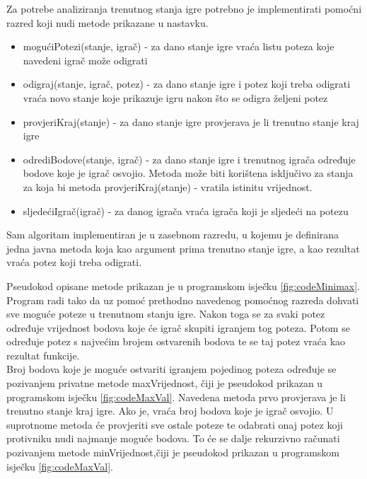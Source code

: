 \documentclass[times, utf8, seminar, numeric, tikz]{fer}
\begin{document}
Za potrebe analiziranja trenutnog stanja igre potrebno je implementirati pomoćni razred koji nudi metode prikazane u nastavku.
\renewcommand{\labelitemi}{\textbullet }
\begin{itemize}
	\item \ttfamily mogućiPotezi(stanje, igrač) - \rmfamily za dano stanje igre vraća listu poteza koje navedeni igrač može odigrati
	\item \ttfamily odigraj(stanje, igrač, potez) - \rmfamily za dano stanje igre i potez koji treba odigrati vraća novo stanje koje prikazuje igru nakon što se odigra željeni potez
	\item \ttfamily provjeriKraj(stanje) - \rmfamily za dano stanje igre provjerava je li trenutno stanje kraj igre
	\item \ttfamily odrediBodove(stanje, igrač) - \rmfamily za dano stanje igre i trenutnog igrača određuje bodove koje je igrač osvojio. Metoda može biti korištena isključivo za stanja za koja bi metoda \ttfamily provjeriKraj(stanje) - \rmfamily vratila istinitu vrijednost.
	\item \ttfamily sljedećiIgrač(igrač) - \rmfamily za danog igrača vraća igrača koji je sljedeći na potezu
\end{itemize}
Sam algoritam implementiran je u zasebnom razredu, u kojemu je definirana jedna javna metoda koja kao argument prima trenutno stanje igre, a kao rezultat vraća potez koji treba odigrati.\\

\begin{minipage}{\textwidth}
	
\end{minipage}


Pseudokod opisane metode prikazan je u programskom isječku \ref{fig:codeMinimax}. Program radi tako da uz pomoć prethodno navedenog pomoćnog razreda dohvati sve moguće poteze u trenutnom stanju igre. Nakon toga se za svaki potez određuje vrijednost bodova koje će igrač skupiti igranjem tog poteza. Potom se određuje potez s najvećim brojem ostvarenih bodova te se taj potez vraća kao rezultat funkcije. \\

Broj bodova koje je moguće ostvariti igranjem pojedinog poteza određuje se pozivanjem privatne metode \ttfamily maxVrijednost\rmfamily, čiji je pseudokod prikazan u programskom isječku \ref{fig:codeMaxVal}. Navedena metoda prvo provjerava je li trenutno stanje kraj igre. Ako je, vraća broj bodova koje je igrač osvojio. U suprotnome metoda će provjeriti sve ostale poteze te odabrati onaj potez koji protivniku nudi najmanje moguće bodova. To će se dalje rekurzivno računati pozivanjem metode \ttfamily minVrijednost\rmfamily,\space čiji je pseudokod prikazan u programskom isječku \ref{fig:codeMaxVal}.\\
\end{document}
